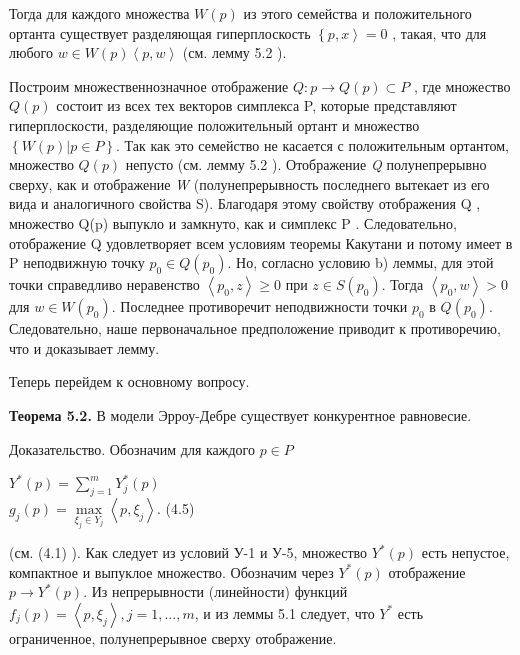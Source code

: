 \documentclass[12pt, 4paper]{book}
\begin{document}
{Тогда для каждого множества $W(p)$ из этого семейства и положительного ортанта существует разделяющая гиперплоскость $\left\{p,x \right\rangle = 0$ , такая, что для любого $w \in W(p) \left\langle p,w \right\rangle$ (см.  лемму 5.2 ).
\par

Построим множественнозначное отображение $Q:p \rightarrow Q(p) \subset P$ , где множество $Q(p)$ состоит из всех тех векторов симплекса P, которые представляют гиперплоскости, разделяющие положительный ортант и множество $\left\{ W(p)|p \in P \right\}$. Так как это семейство не касается с положительным ортантом, множество $Q(p)$ непусто (см. лемму 5.2 ). Отображение \textit{Q} полунепрерывно сверху, как и отображение \textit{W} (полунепрерывность последнего вытекает из его вида и аналогичного свойства S). Благодаря этому свойству отображения Q , множество Q(p) выпукло и замкнуто, как и симплекс P . Следовательно, отображение Q удовлетворяет всем условиям теоремы Какутани и потому имеет в P неподвижную точку $p_0 \in Q(p_0)$. Но, согласно условию b) леммы, для этой точки справедливо неравенство $\left\langle p_0,z \right\rangle \geq 0$ при $z \in S(p_0)$. Тогда $\left\langle  p_0,w \right\rangle > 0$ для $w \in W(p_0)$. Последнее противоречит неподвижности точки $p_0$ в $Q(p_0)$. Следовательно, наше первоначальное предположение приводит к противоречию, что и доказывает лемму.
\par

Теперь перейдем к основному вопросу.
\par

\textbf{Теорема 5.2.} В модели Эрроу-Дебре существует конкурентное равновесие.
\par
 
Доказательство. Обозначим для каждого $p \in P$
\begin{center}
$Y^{*}(p)=\sum\limits_{j=1}^{m}Y_{j}^{*}(p)$\\
$g_j(p)=\max\limits_{\xi_j \in Y_j} \left\langle p,\xi_j \right\rangle$. (4.5)
\end{center}
(см. (4.1) ). Как следует из условий У-1 и У-5, множество $Y^{*}(p)$ есть непустое, компактное и выпуклое множество. Обозначим через $Y^{*}(p)$ отображение $p \rightarrow Y^{*}(p)$. Из непрерывности (линейности) функций $f_{j}(p)=\left\langle p,\xi_j \right\rangle , j=1,...,m$, и из леммы 5.1 следует, что $Y^{*}$ есть ограниченное, полунепрерывное сверху отображение.
\par
 
}
\end{document}
